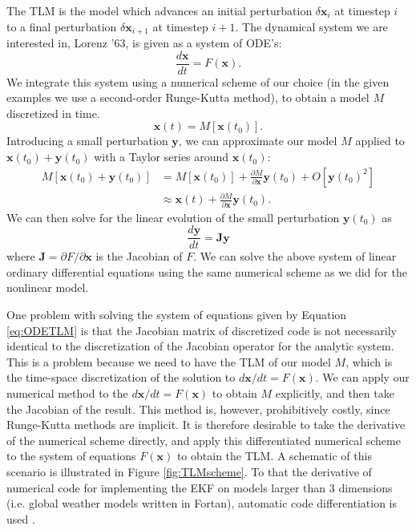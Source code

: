 \documentclass[pre,twocolumn,twoside,byrevtex,superscriptaddress]{revtex4}
\newcommand{\mbx}{\mathbf{x}}
\newcommand{\mby}{\mathbf{y}}
\begin{document}
The TLM is the model which advances an initial perturbation $\delta \mbx_{i}$ at timestep $i$ to a final perturbation $\delta \mbx_{i+1}$ at timestep $i+1$.
The dynamical system we are interested in, Lorenz '63, is given as a system of ODE's:
\[ \frac{d\mbx}{dt} = F(\mbx) .\]
We integrate this system using a numerical scheme of our choice (in the given examples we use a second-order Runge-Kutta method), to obtain a model $M$ discretized in time.
\[ \mbx(t) = M[ \mbx(t_0) ] .\]
Introducing a small perturbation $\mby$, we can approximate our model $M$ applied to $\mbx(t_0) + \mby(t_0)$ with a Taylor series around $\mbx(t_0)$:
\begin{align*} M[ \mbx(t_0) + \mby(t_0) ] &= M [ \mbx(t_0) ] + \frac{\partial M}{\partial \mbx} \mby(t_0) + O [ \mby(t_0) ^2 ]\\ &\approx \mbx(t) + \frac{\partial M}{\partial \mbx} \mby(t_0) .\end{align*}
We can then solve for the linear evolution of the small perturbation $\mby(t_0)$ as 
\begin{equation} \frac{d\mby }{dt } = \mathbf{J} \mby \label{eq:ODETLM} \end{equation}
where $\mathbf{J} = \partial F / \partial \mbx$ is the Jacobian of $F$.
We can solve the above system of linear ordinary differential equations using the same numerical scheme as we did for the nonlinear model.

One problem with solving the system of equations given by Equation \ref{eq:ODETLM} is that the Jacobian matrix of discretized code is not necessarily identical to the discretization of the Jacobian operator for the analytic system.
This is a problem because we need to have the TLM of our model $M$, which is the time-space discretization of the solution to $d\mbx/dt = F(\mbx)$.
We can apply our numerical method to the $d\mbx/dt = F(\mbx)$ to obtain $M$ explicitly, and then take the Jacobian of the result.
This method is, however, prohibitively costly, since Runge-Kutta methods are implicit.
It is therefore desirable to take the derivative of the numerical scheme directly, and apply this differentiated numerical scheme to the system of equations $F(\mbx)$ to obtain the TLM.
A schematic of this scenario is illustrated in Figure \ref{fig:TLMscheme}.
To that the derivative of numerical code for implementing the EKF on models larger than 3 dimensions (i.e. global weather models written in Fortan), automatic code differentiation is used \cite{autodiff1981}.
\end{document}
